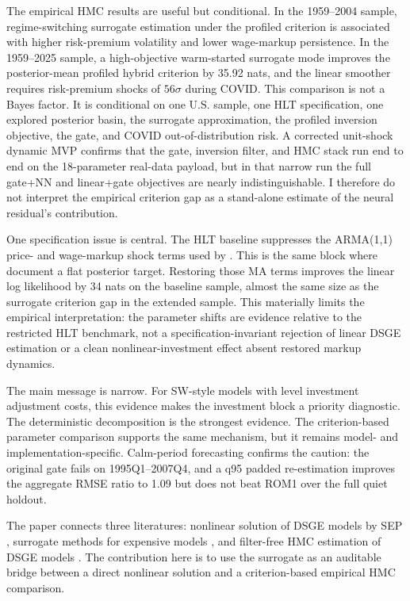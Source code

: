 \documentclass[12pt]{article}
\theoremstyle{plain}
\theoremstyle{definition}
\theoremstyle{remark}
\begin{document}
The empirical HMC results are useful but conditional. In the 1959--2004 sample,
regime-switching surrogate estimation under the profiled criterion is associated
with higher risk-premium volatility and lower wage-markup persistence. In the
1959--2025 sample, a high-objective warm-started surrogate mode improves the
posterior-mean profiled hybrid criterion by 35.92 nats, and the linear smoother
requires risk-premium shocks of \(56\sigma\) during COVID. This comparison is
not a Bayes factor. It is conditional on one U.S. sample, one HLT
specification, one explored posterior basin, the surrogate approximation, the
profiled inversion objective, the gate, and COVID out-of-distribution risk. A
corrected unit-shock dynamic MVP confirms that the gate, inversion filter, and
HMC stack run end to end on the 18-parameter real-data payload, but in that
narrow run the full gate+NN and linear+gate objectives are nearly
indistinguishable. I therefore do not interpret the empirical criterion gap as a
stand-alone estimate of the neural residual's contribution.

One specification issue is central. The HLT baseline suppresses the ARMA(1,1)
price- and wage-markup shock terms used by \citet{smets2007shocks}. This is the
same block where \citet{farkas2020bayesian} document a flat posterior target.
Restoring those MA terms improves the linear log likelihood by 34 nats on the
baseline sample, almost the same size as the surrogate criterion gap in the
extended sample. This materially limits the empirical interpretation: the
parameter shifts are evidence relative to the restricted HLT benchmark, not a
specification-invariant rejection of linear DSGE estimation or a clean
nonlinear-investment effect absent restored markup dynamics.

The main message is narrow. For SW-style models with level investment
adjustment costs, this evidence makes the investment block a priority
diagnostic. The deterministic decomposition is the strongest evidence. The
criterion-based parameter comparison supports the same mechanism, but it
remains model- and implementation-specific. Calm-period forecasting confirms
the caution: the original gate fails on 1995Q1--2007Q4, and a q95 padded
re-estimation improves the aggregate RMSE ratio to 1.09 but does not beat ROM1
over the full quiet holdout.

The paper connects three literatures: nonlinear solution of DSGE models by SEP
\citep{fair1983solution,adjemian2025stochastic}, surrogate methods for
expensive models \citep{peherstorfer2018survey,kennedy2001bayesian,kase2025estimating,naubert2025differentiable},
and filter-free HMC estimation of DSGE models
\citep{childers2022filter,farkas2020bayesian}. The contribution here is to use
the surrogate as an auditable bridge between a direct nonlinear solution and a
criterion-based empirical HMC comparison.
\end{document}
